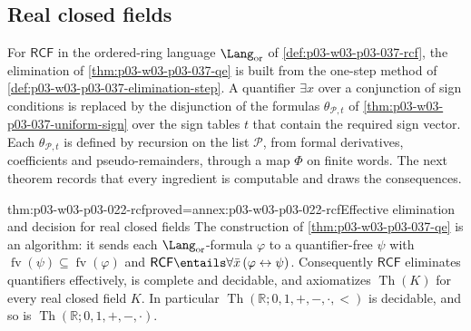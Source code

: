 \subsection{Real closed fields}
\label{sec:p03-w03-p03-022-rcf}

For \(\mathsf{RCF}\) in the ordered-ring language \(\Lang_{\mathrm{or}}\) of
\cref{def:p03-w03-p03-037-rcf}, the elimination of
\cref{thm:p03-w03-p03-037-qe} is built from the one-step method of
\cref{def:p03-w03-p03-037-elimination-step}. A quantifier \(\exists x\) over
a conjunction of sign conditions is replaced by the disjunction of the
formulas \(\theta_{\mathcal P,t}\) of \cref{thm:p03-w03-p03-037-uniform-sign}
over the sign tables \(t\) that contain the required sign vector. Each
\(\theta_{\mathcal P,t}\) is defined by recursion on the list
\(\mathcal P\), from formal derivatives, coefficients and pseudo-remainders,
through a map \(\Phi\) on finite words. The next theorem records that every
ingredient is computable and draws the consequences.

\begin{hbtheorem}{thm:p03-w03-p03-022-rcf}{proved=annex:p03-w03-p03-022-rcf}{Effective elimination and decision for real closed fields}
The construction of \cref{thm:p03-w03-p03-037-qe} is an algorithm: it
sends each \(\Lang_{\mathrm{or}}\)-formula \(\varphi\) to a quantifier-free
\(\psi\) with \(\operatorname{fv}(\psi)\subseteq\operatorname{fv}(\varphi)\)
and \(\mathsf{RCF}\entails\forall\bar x\,(\varphi\leftrightarrow\psi)\).
Consequently \(\mathsf{RCF}\) eliminates quantifiers effectively, is
complete and decidable, and axiomatizes \(\operatorname{Th}(K)\) for every
real closed field \(K\). In particular
\(\operatorname{Th}(\mathbb R;0,1,+,-,\cdot,<)\) is decidable, and so is
\(\operatorname{Th}(\mathbb R;0,1,+,-,\cdot)\).
\end{hbtheorem}

